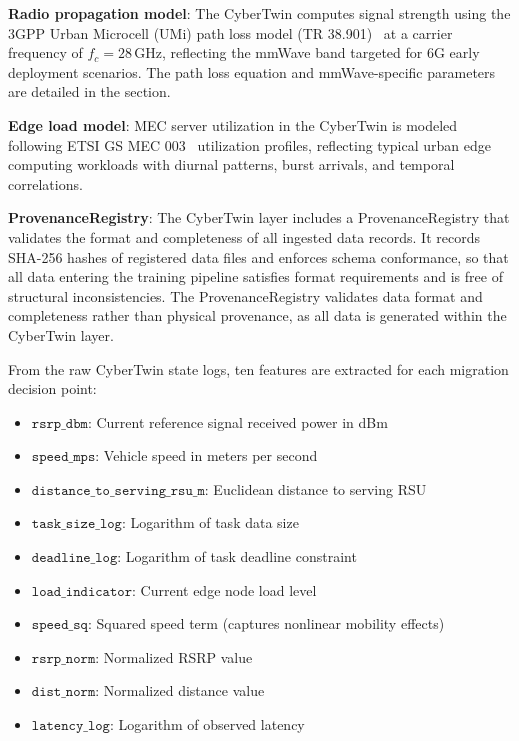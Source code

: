 \documentclass[10pt,letterpaper]{article}
\begin{document}
\textbf{Radio propagation model}: The CyberTwin computes signal strength using the 3GPP Urban Microcell (UMi) path loss model (TR 38.901)~\cite{3gpp2018ts} at a carrier frequency of $f_c = 28$\,GHz, reflecting the mmWave band targeted for 6G early deployment scenarios. The path loss equation and mmWave-specific parameters are detailed in the  section.

\textbf{Edge load model}: MEC server utilization in the CyberTwin is modeled following ETSI GS MEC 003~\cite{etsi_mec003} utilization profiles, reflecting typical urban edge computing workloads with diurnal patterns, burst arrivals, and temporal correlations.

\textbf{ProvenanceRegistry}: The CyberTwin layer includes a ProvenanceRegistry that validates the format and completeness of all ingested data records. It records SHA-256 hashes of registered data files and enforces schema conformance, so that all data entering the training pipeline satisfies format requirements and is free of structural inconsistencies. The ProvenanceRegistry validates data format and completeness rather than physical provenance, as all data is generated within the CyberTwin layer.

From the raw CyberTwin state logs, ten features are extracted for each migration decision point:

\begin{itemize}
    \item $\texttt{rsrp\_dbm}$: Current reference signal received power in dBm
    \item $\texttt{speed\_mps}$: Vehicle speed in meters per second
    \item $\texttt{distance\_to\_serving\_rsu\_m}$: Euclidean distance to serving RSU
    \item $\texttt{task\_size\_log}$: Logarithm of task data size
    \item $\texttt{deadline\_log}$: Logarithm of task deadline constraint
    \item $\texttt{load\_indicator}$: Current edge node load level
    \item $\texttt{speed\_sq}$: Squared speed term (captures nonlinear mobility effects)
    \item $\texttt{rsrp\_norm}$: Normalized RSRP value
    \item $\texttt{dist\_norm}$: Normalized distance value
    \item $\texttt{latency\_log}$: Logarithm of observed latency
\end{itemize}
\end{document}
